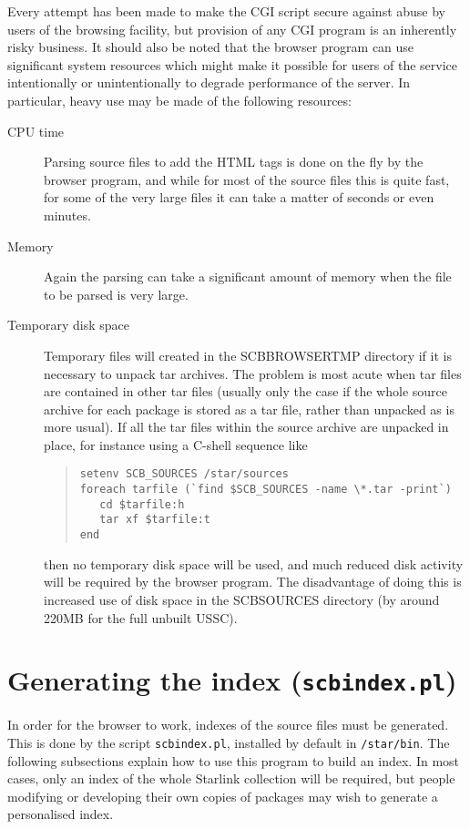 \documentclass[twoside,11pt]{article}
\newcommand{\xlabel}[1]{}
\renewcommand{\_}{\texttt{\symbol{95}}}
\begin{document}
Every attempt has been made to make the CGI script secure against
abuse by users of the browsing facility,
but provision of any CGI program is an inherently risky business.
It should also be noted that the browser 
program can use significant system resources which might 
make it possible for users of the service intentionally or 
unintentionally to degrade performance of the server.
In particular, heavy use may be made of the following resources:
\begin{description}
\item[CPU time] 
Parsing source files to add the HTML tags is done on the fly by 
the browser program, and while for most of the source files this 
is quite fast, for some of the very large files it can 
take a matter of seconds or even minutes.
\item[Memory]
Again the parsing can take a significant amount of memory when the
file to be parsed is very large.
\item[Temporary disk space]
Temporary files will created in the SCB\_BROWSER\_TMP directory
if it is necessary to unpack tar archives.  The problem is most acute
when tar files are contained in other tar files (usually only the
case if the whole source archive for each package is stored as a tar file,
rather than unpacked as is more usual).  
If all the tar files within the source archive are unpacked in place,
for instance using a C-shell sequence like 
\begin{quote}
\begin{verbatim}
setenv SCB_SOURCES /star/sources
foreach tarfile (`find $SCB_SOURCES -name \*.tar -print`)
   cd $tarfile:h
   tar xf $tarfile:t
end
\end{verbatim}
\end{quote}
then no temporary disk space will be used, and much reduced disk
activity will be required by the browser program.
The disadvantage of doing this is increased use of disk space
in the SCB\_SOURCES directory 
(by around 220MB for the full unbuilt USSC). 
\end{description}





\section{\xlabel{sec:indexing}\label{sec:indexing}Generating the index
         ({\tt scbindex.pl})}

In order for the browser to work, indexes of the source files must be
generated.  This is done by the script {\tt scbindex.pl}, installed
by default in {\tt /star/bin}.
The following subsections explain how to use this program to
build an index.  In most cases, only an index of the whole Starlink
collection will be required, but people modifying or developing
their own copies of packages may wish to generate a personalised index.
\end{document}
